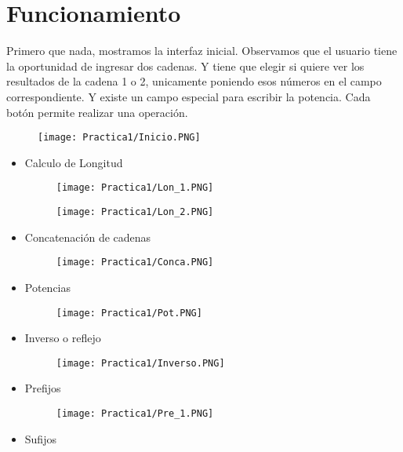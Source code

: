 \documentclass[12pt]{article}
\begin{document}
	\section{Funcionamiento}
	Primero que nada, mostramos la interfaz inicial. Observamos que el 
	usuario tiene la oportunidad de ingresar dos cadenas. Y tiene que elegir si quiere ver los resultados de la cadena 1 o 2, unicamente poniendo esos números en el campo correspondiente. Y existe un campo especial para escribir la potencia. Cada botón permite realizar una operación.

	\begin{figure}[H]
	        \centering
	        \texttt{[image: Practica1/Inicio.PNG]}
    \end{figure}

	\begin{itemize}

		\item Calculo de Longitud
		
		\begin{figure}[H]
	        \centering
	        \texttt{[image: Practica1/Lon\_1.PNG]}
    	\end{figure}
		\begin{figure}[H]
	        \centering
	        \texttt{[image: Practica1/Lon\_2.PNG]}
    	\end{figure}

		\item Concatenación de cadenas

		\begin{figure}[H]
	        \centering
	        \texttt{[image: Practica1/Conca.PNG]}
    	\end{figure}
    	
		\item Potencias

		\begin{figure}[H]
	        \centering
	        \texttt{[image: Practica1/Pot.PNG]}
    	\end{figure}
    \newpage
		\item Inverso o reflejo
		
		\begin{figure}[H]
	        \centering
	        \texttt{[image: Practica1/Inverso.PNG]}
    	\end{figure}
    	
		\item Prefijos
		\begin{figure}[H]
	        \centering
	        \texttt{[image: Practica1/Pre\_1.PNG]}
    	\end{figure}
   	\newpage
		\item Sufijos


\end{itemize}
\end{document}

